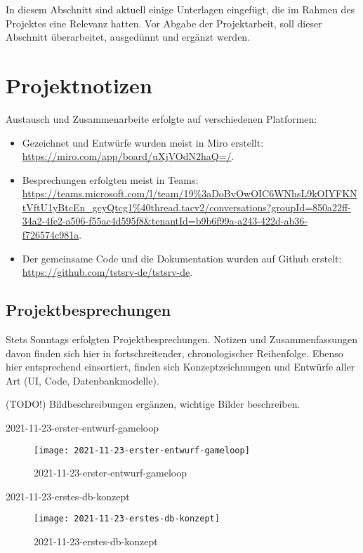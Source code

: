 


In diesem Abschnitt sind aktuell einige Unterlagen eingefügt, die im Rahmen des Projektes eine Relevanz hatten. Vor Abgabe der Projektarbeit, soll dieser Abschnitt überarbeitet, ausgedünnt und ergänzt werden. 

\section{Projektnotizen}

Austausch und Zusammenarbeite erfolgte auf verschiedenen Platformen:
\begin{itemize}
    \item Gezeichnet und Entwürfe wurden meist in Miro erstellt: \url{https://miro.com/app/board/uXjVOdN2haQ=/}. 
    \item Besprechungen erfolgten meist in Teams: \url{https://teams.microsoft.com/l/team/19%3aDoBvOwOIC6WNhsL9kOIYFKNtVftU1yBtcEn_gcyQtcg1%40thread.tacv2/conversations?groupId=850a22ff-34a2-4fe2-a506-f55ac4d595f8&tenantId=b9b6f99a-a243-422d-ab36-f726574c981a}. 
    \item Der gemeinsame Code und die Dokumentation wurden auf Github erstelt: \url{https://github.com/tstsrv-de/tstsrv-de}. 
\end{itemize}

\subsection{Projektbesprechungen}

Stets Sonntags erfolgten Projektbesprechungen. Notizen und Zusammenfassungen davon finden sich hier in fortschreitender, chronologischer Reihenfolge. Ebenso hier entsprechend einsortiert, finden sich Konzeptzeichnungen und Entwürfe aller Art (UI, Code, Datenbankmodelle).

(TODO!) Bildbeschreibungen ergänzen, wichtige Bilder beschreiben.

2021-11-23-erster-entwurf-gameloop 
\begin{figure}[H]
    \centering
    \caption[]{2021-11-23-erster-entwurf-gameloop}
    \label{fig:2021-11-23-erster-entwurf-gameloop}
    \texttt{[image: 2021-11-23-erster-entwurf-gameloop]}
\end{figure}

2021-11-23-erstes-db-konzept 
\begin{figure}[H]
    \centering
    \caption[]{2021-11-23-erstes-db-konzept}
    \label{fig:2021-11-23-erstes-db-konzept}
    \texttt{[image: 2021-11-23-erstes-db-konzept]}
\end{figure}

